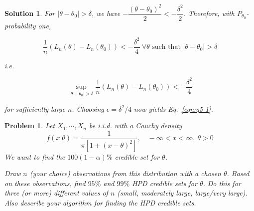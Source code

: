 \documentclass[12pt]{article}
\theoremstyle{problemstyle}
\newtheorem{pbm}{Problem}
\newtheorem*{solution*}{Solution}
\newenvironment{problem}{
\begin{tcolorbox}[colback=green!10!white,colframe=black!75!black, parbox = false]\begin{pbm} }{\end{pbm}\end{tcolorbox} }
\begin{document}
\begin{solution*}
    For $\vert \theta - \theta_0 \vert > \delta$, we have $-\dfrac{(\theta - \theta_0)^2}{2} < -\dfrac{\delta^2}{2}$. Therefore, with $P_{\theta_0}$-probability one, 

    $$
    \dfrac{1}{n}(L_n(\theta) - L_n(\theta_0)) < -\dfrac{\delta^2}{4} \ \forall \theta \text{ such that } \vert \theta - \theta_0 \vert > \delta
    $$

    i.e. 

    $$
    \sup_{\vert \theta - \theta_0 \vert > \delta} \dfrac{1}{n}(L_n(\theta) - L_n(\theta_0)) < -\dfrac{\delta^2}{4}
    $$

    for sufficiently large $n$. Choosing $\epsilon = \delta^2/4$ now yields Eq.~\eqref{eqn:q5-1}.

\end{solution*}
\pagebreak




\begin{problem}
Let $X_1,\cdots, X_n$ be i.i.d. with a Cauchy density
$$f(x|\theta) = \dfrac{1}{\pi[1+(x-\theta)^2]},\quad -\infty<x<\infty,\ \theta>0$$
We want to find the $100(1-\alpha)\%$ credible set for $\theta$. 

Draw $n$ (your choice) observations from this distribution with a chosen
$\theta$. Based on these observations, find $95\%$ and $99\%$ HPD credible sets for $\theta$. Do this for three (or more) different values of $n$ (small, moderately large, large/very large). Also describe your algorithm for finding the HPD credible sets.
\end{problem}
\end{document}

